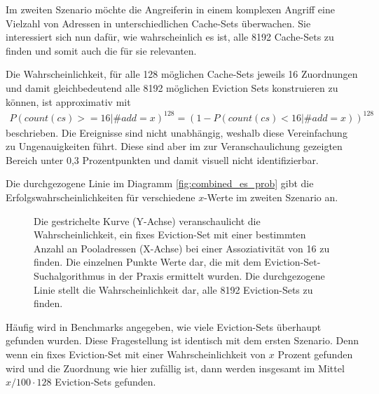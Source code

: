 
Im zweiten Szenario möchte die Angreiferin in einem komplexen Angriff eine Vielzahl von Adressen in unterschiedlichen Cache-Sets überwachen. 
Sie interessiert sich nun dafür, wie wahrscheinlich es ist, alle 8192 Cache-Sets zu finden und somit auch die für sie relevanten. 

Die Wahrscheinlichkeit, für alle 128 möglichen Cache-Sets jeweils 16 Zuordnungen und damit gleichbedeutend alle 8192 möglichen Eviction Sets konstruieren zu können, ist approximativ mit
\begin{align*}
P(count(cs)>=16|\#add = x)^{128} = (1-P(count(cs)<16|\#add = x))^{128}
\end{align*}
beschrieben.
Die Ereignisse sind nicht unabhängig, weshalb diese Vereinfachung zu Ungenauigkeiten führt.
Diese sind aber im zur Veranschaulichung gezeigten Bereich unter 0,3 Prozentpunkten und damit visuell nicht identifizierbar.

Die durchgezogene Linie im Diagramm \ref{fig:combined_es_prob} gibt die Erfolgswahrscheinlichkeiten für verschiedene $x$-Werte im zweiten Szenario an. 


\label{fig:combined_es_prob}
\begin{figure}[h]
\centering
\begin{scaletikzpicturetowidth}{\textwidth}

\end{scaletikzpicturetowidth}
\caption{Die gestrichelte Kurve (Y-Achse) veranschaulicht die Wahrscheinlichkeit, ein fixes Eviction-Set mit einer bestimmten Anzahl an Pooladressen (X-Achse) bei einer Assoziativität von 16 zu finden. Die einzelnen Punkte Werte dar, die mit dem Eviction-Set-Suchalgorithmus in der Praxis ermittelt wurden.
Die durchgezogene Linie stellt die Wahrscheinlichkeit dar, alle 8192 Eviction-Sets zu finden.}
\end{figure}

Häufig wird in Benchmarks angegeben, wie viele Eviction-Sets überhaupt gefunden wurden.
Diese Fragestellung ist identisch mit dem ersten Szenario.
Denn wenn ein fixes Eviction-Set mit einer Wahrscheinlichkeit von $x$ Prozent gefunden wird und die Zuordnung wie hier zufällig ist, dann werden insgesamt im Mittel $x/100 \cdot 128$ Eviction-Sets gefunden.

